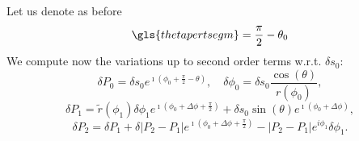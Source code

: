 \documentclass[reqno]{amsart}
\theoremstyle{definition} \newtheorem{definition}{Definition}[section]
\theoremstyle{definition} \newtheorem{remark}[definition]{Remark}
\theoremstyle{plain} \newtheorem{lemma}[definition]{Lemma}
\theoremstyle{plain} \newtheorem{proposition}[definition]{Proposition}
\theoremstyle{plain} \newtheorem{theorem}[definition]{Theorem}
\theoremstyle{plain} \newtheorem{corollary}[definition]{Corollary}
\theoremstyle{definition} \newtheorem{example}[definition]{Example}
\theoremstyle{plain} \newtheorem{claim}[clai]{Claim}
\theoremstyle{definition} \newtheorem{assumption}[definition]{Assumption}
\theoremstyle{definition} \newtheorem{observation}[definition]{Observation}
\newcommand{\1}{\mathbbm 1}
\renewcommand{\i}{\imath}
\numberwithin{equation}{section} %
\theoremstyle{plain} \newtheorem*{theorem*}{Theorem}
\theoremstyle{plain} \newtheorem{mthm}[maintheorem]{Main Theorem}
\theoremstyle{plain} \newtheorem*{mthm*}{Main Theorem}
\theoremstyle{plain} \newtheorem*{conjecture*}{Conjecture}
\theoremstyle{plain} \newtheorem{conjecture}[definition]{Conjecture}
\theoremstyle{plain} \newtheorem*{problem*}{Problem}
\begin{document}
Let us denote as before
\begin{equation*}
\gls{thetapertsegm} = \frac{\pi}{2} - \theta_0
\end{equation*}
We compute now the variations up to second order terms w.r.t. $\delta s_0$:
\begin{equation*}
\delta P_0 = \delta s_0 e^{\i (\phi_0 + \frac{\pi}{2} - \theta)}, \quad \delta \phi_0 = \delta s_0 \frac{\cos(\theta)}{r(\phi_0)},
\end{equation*}
\begin{equation}\label{eq:P:1:arc}
\delta P_1 = \tilde r(\phi_1) \delta \phi_1 e^{\i (\phi_0 + \Delta\phi + \frac{\pi}{2})} + \delta s_0 \sin(\theta) e^{\i (\phi_0 + \Delta \phi)},
\end{equation}
\begin{equation}\label{eq:P:2:arc}
\delta P_2 = \delta P_1 + \delta |P_2 - P_1| e^{\i (\phi_0 + \Delta\phi + \frac{\pi}{2})} - |P_2 - P_1|e^{i\phi_1} \delta \phi_1.
\end{equation}
\end{document}
